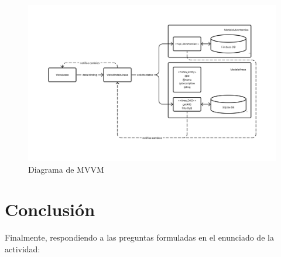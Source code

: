 \documentclass{article}
\begin{document}
    \begin{figure}[H]
        \centerline{\includegraphics[scale=0.3]{bbdddiagram}}
        \caption{Diagrama de MVVM}
        \label{fig:bbdddiagram}
    \end{figure}

    \section{Conclusión}
    Finalmente, respondiendo a las preguntas formuladas en el enunciado de la actividad:
    
\end{document}
